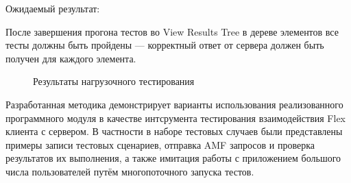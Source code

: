 Ожидаемый результат:

 После завершения прогона тестов во View Results Tree в дереве элементов все тесты должны быть пройдены ---
 корректный ответ от сервера должен быть получен для каждого элемента.

 \begin{figure}[ht]
\caption{Результаты нагрузочного тестирования}
\label{ris:load.png}
\end{figure}

Разработанная методика демонстрирует варианты использования реализованного программного модуля в
качестве интсрумента тестирования взаимодействия Flex клиента с сервером. В частности в наборе
тестовых случаев были представлены примеры записи тестовых сценариев, отправка AMF запросов и
проверка результатов их выполнения, а также имитация работы с приложением большого числа пользователей
путём многопоточного запуска тестов.















